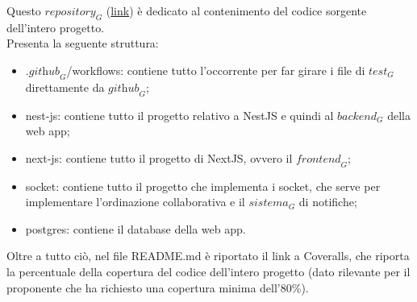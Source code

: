 Questo $\textit{repository}_G$ (\href{https://github.com/RAMtastic6/EasyMeal}{link}) è dedicato al contenimento del codice sorgente dell'intero progetto. \\
Presenta la seguente struttura:
\begin{itemize}
    \item .$\textit{github}_G$/workflows: contiene tutto l'occorrente per far girare i file di $\textit{test}_G$ direttamente da $\textit{github}_G$;
    \item nest-js: contiene tutto il progetto relativo a NestJS e quindi al $\textit{backend}_G$ della web app;
    \item next-js: contiene tutto il progetto di NextJS, ovvero il $\textit{frontend}_G$;
    \item socket: contiene tutto il progetto che implementa i socket, che serve per implementare l’ordinazione collaborativa e il $\textit{sistema}_G$ di notifiche;
    \item postgres: contiene il database della web app.
\end{itemize}
Oltre a tutto ciò, nel file README.md è riportato il link a Coveralls, che riporta la percentuale della copertura del codice dell'intero progetto (dato rilevante per il proponente che ha richiesto una copertura minima dell'80\%).


